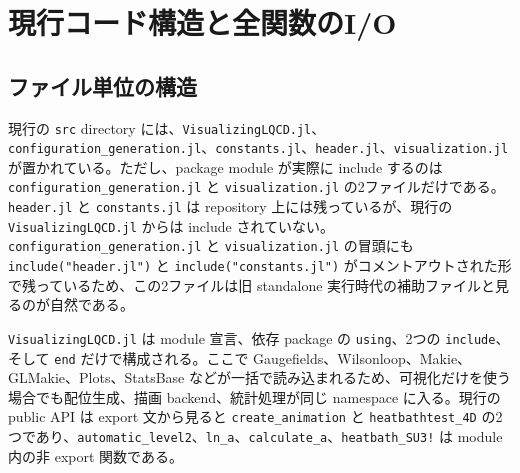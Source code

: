 \documentclass[uplatex,dvipdfmx,ja=standard,11pt,a4paper]{bxjsarticle}
\newcommand{\code}[1]{\texttt{#1}}
\begin{document}
\section{現行コード構造と全関数のI/O}
\subsection{ファイル単位の構造}
現行の \code{src} directory には、\code{VisualizingLQCD.jl}、\code{configuration\_generation.jl}、\code{constants.jl}、\code{header.jl}、\code{visualization.jl} が置かれている\cite{VisualizingSrcTree}。ただし、package module が実際に include するのは \code{configuration\_generation.jl} と \code{visualization.jl} の2ファイルだけである。\code{header.jl} と \code{constants.jl} は repository 上には残っているが、現行の \code{VisualizingLQCD.jl} からは include されていない。\code{configuration\_generation.jl} と \code{visualization.jl} の冒頭にも \code{include("header.jl")} と \code{include("constants.jl")} がコメントアウトされた形で残っているため、この2ファイルは旧 standalone 実行時代の補助ファイルと見るのが自然である\cite{VisualizingVisualization,VisualizingConfig}。

\code{VisualizingLQCD.jl} は module 宣言、依存 package の \code{using}、2つの \code{include}、そして \code{end} だけで構成される。ここで Gaugefields、Wilsonloop、Makie、GLMakie、Plots、StatsBase などが一括で読み込まれるため、可視化だけを使う場合でも配位生成、描画 backend、統計処理が同じ namespace に入る\cite{VisualizingModule}。現行の public API は export 文から見ると \code{create\_animation} と \code{heatbathtest\_4D} の2つであり、\code{automatic\_level2}、\code{ln\_a}、\code{calculate\_a}、\code{heatbath\_SU3!} は module 内の非 export 関数である\cite{VisualizingVisualization,VisualizingConfig}。
\end{document}
